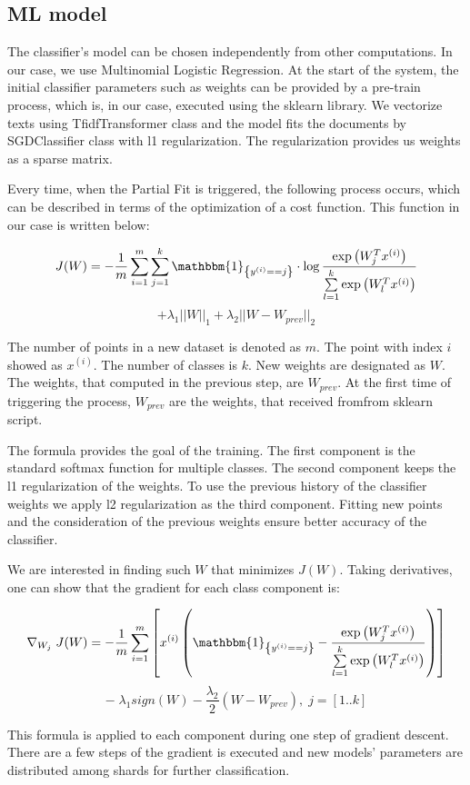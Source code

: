 \subsection{ML model \label{ML}}

The classifier's model can be chosen independently from other computations. In our case, we use Multinomial Logistic Regression. At the start of the system, the initial classifier parameters such as weights can be provided by a pre-train process, which is, in our case, executed using the sklearn library. We vectorize texts using TfidfTransformer class and the model fits the documents by SGDClassifier class with l1 regularization. The regularization provides us weights as a sparse matrix.

Every time, when the Partial Fit is triggered, the following process occurs, which can be described in terms of the optimization of a cost function. This function in our case is written below:

\begin{center}

$$ J(W) = -\frac{1}{m} \sum \limits_{i = 1}^{m} \sum \limits_{j = 1}^{k} \mathbbm{1}_{\left\{y^{(i)} == j\right\}} \cdot \log \frac{\exp\left({W_{j}^Tx^{(i)}}\right) }{\sum \limits_{l = 1}^{k}  \exp\left({W_{l}^Tx^{(i)}}\right) }$$ 
 $$ +  \lambda_1 ||W||_1 + \lambda_2 ||W - W_{prev}||_2 $$

\end{center} 

The number of points in a new dataset is denoted as $m$. The point with index $i$ showed as $x^{(i)}$. The number of classes is $k$. New weights are designated as $W$. The weights, that computed in the previous step, are $W_{prev}$. At the first time of triggering the process, $W_{prev}$ are the weights, that received fromfrom sklearn script. 

The formula provides the goal of the training. The first component is the standard softmax function for multiple classes. The second component keeps the l1 regularization of the weights. To use the previous history of the classifier weights we apply l2 regularization as the third component. Fitting new points and the consideration of the previous weights ensure better accuracy of the classifier.

We are interested in finding such $W$ that minimizes $J(W)$. Taking derivatives, one can show that the gradient for each class component is:

\begin{center}

$$ \nabla_{W_j} \; J(W) = -\frac{1}{m} \sum \limits_{i = 1}^{m} \left[ x^{(i)} \left( \mathbbm{1}_{\left\{y^{(i)} == j\right\} } - \frac{\exp\left({W_{j}^Tx^{(i)}}\right)}{\sum \limits_{l = 1}^{k}  \exp\left({W_{l}^Tx^{(i)}}\right)} \right) \right] $$
$$ - \; \lambda_1 sign\left(W\right) - \frac{\lambda_2}{2} \left(W - W_{prev} \right), \; j = [1..k] $$

\end{center} 

This formula is applied to each component during one step of gradient descent. There are a few steps of the gradient is executed and new models' parameters are distributed among shards for further classification.